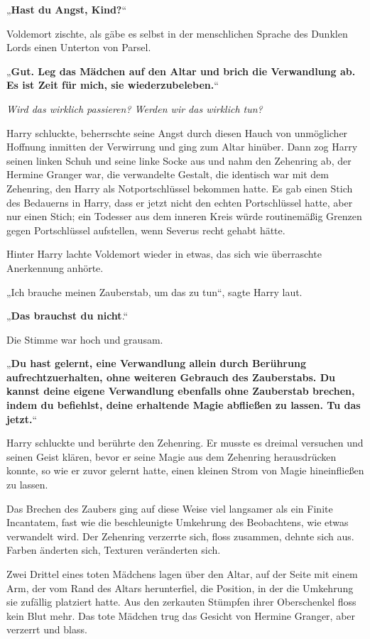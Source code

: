 {„\textbf{Hast du Angst, Kind?}“

Voldemort zischte, als gäbe es selbst in der menschlichen Sprache des Dunklen Lords einen Unterton von Parsel.

„\textbf{Gut. Leg das Mädchen auf den Altar und brich die Verwandlung ab. Es ist Zeit für mich, sie wiederzubeleben.}“

\emph{Wird das wirklich passieren? Werden wir das wirklich tun?}

Harry schluckte, beherrschte seine Angst durch diesen Hauch von unmöglicher Hoffnung inmitten der Verwirrung und ging zum Altar hinüber. Dann zog Harry seinen linken Schuh und seine linke Socke aus und nahm den Zehenring ab, der Hermine Granger war, die verwandelte Gestalt, die identisch war mit dem Zehenring, den Harry als Notportschlüssel bekommen hatte. Es gab einen Stich des Bedauerns in Harry, dass er jetzt nicht den echten Portschlüssel hatte, aber nur einen Stich; ein Todesser aus dem inneren Kreis würde routinemäßig Grenzen gegen Portschlüssel aufstellen, wenn Severus recht gehabt hätte.

Hinter Harry lachte Voldemort wieder in etwas, das sich wie überraschte Anerkennung anhörte.

„Ich brauche meinen Zauberstab, um das zu tun“, sagte Harry laut.

„\textbf{Das brauchst du nicht}.“

Die Stimme war hoch und grausam.

„\textbf{Du hast gelernt, eine Verwandlung allein durch Berührung aufrechtzuerhalten, ohne weiteren Gebrauch des Zauberstabs. Du kannst deine eigene Verwandlung ebenfalls ohne Zauberstab brechen, indem du befiehlst, deine erhaltende Magie abfließen zu lassen. Tu das jetzt.}“

Harry schluckte und berührte den Zehenring. Er musste es dreimal versuchen und seinen Geist klären, bevor er seine Magie aus dem Zehenring herausdrücken konnte, so wie er zuvor gelernt hatte, einen kleinen Strom von Magie hineinfließen zu lassen.

Das Brechen des Zaubers ging auf diese Weise viel langsamer als ein Finite Incantatem, fast wie die beschleunigte Umkehrung des Beobachtens, wie etwas verwandelt wird. Der Zehenring verzerrte sich, floss zusammen, dehnte sich aus. Farben änderten sich, Texturen veränderten sich.

Zwei Drittel eines toten Mädchens lagen über den Altar, auf der Seite mit einem Arm, der vom Rand des Altars herunterfiel, die Position, in der die Umkehrung sie zufällig platziert hatte. Aus den zerkauten Stümpfen ihrer Oberschenkel floss kein Blut mehr. Das tote Mädchen trug das Gesicht von Hermine Granger, aber verzerrt und blass.

}
